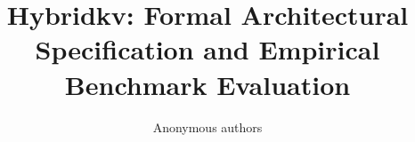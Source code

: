 \title{\textbf{Hybridkv: Formal Architectural Specification and Empirical Benchmark Evaluation}}

\author{Anonymous authors}
